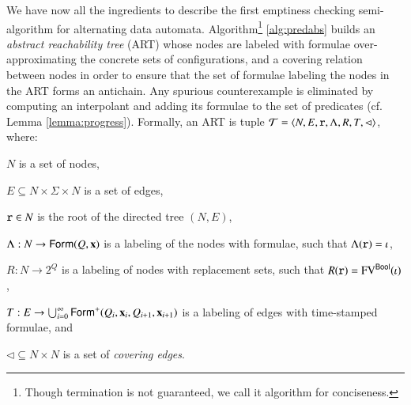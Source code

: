 \documentclass[10pt]{llncs}
\begin{document}
We have now all the ingredients to describe the first emptiness
checking semi-algorithm for alternating data
automata. Algorithm\footnote{Though termination is not guaranteed, we
  call it algorithm for conciseness.} \ref{alg:predabs} builds an
\emph{abstract reachability tree} (ART) whose nodes are labeled with
formulae over-approximating the concrete sets of configurations, and a
covering relation between nodes in order to ensure that the set of
formulae labeling the nodes in the ART forms an antichain. Any
spurious counterexample is eliminated by computing an interpolant and
adding its formulae to the set of predicates (cf. Lemma
\ref{lemma:progress}). Formally, an ART is tuple $\mathcal{T} =
\left\langle N,E,\mathtt{r},\Lambda,R,T,\lhd \right\rangle$, where: \begin{compactitem}
\item $N$ is a set of nodes, 
%
\item $E \subseteq N \times \Sigma \times
N$ is a set of edges, 
%
\item $\mathtt{r} \in N$ is the root of the directed
tree $(N,E)$, 
%
\item $\Lambda : N \rightarrow \mathsf{Form}(Q,\mathbf x)$ is a labeling of the
  nodes with formulae, such that $\Lambda(\mathtt{r}) = \iota$,
%
\item $R : N \rightarrow 2^Q$ is a labeling of nodes with replacement
  sets, such that $R(\mathtt{r}) = \mathrm{FV}^{\mathsf{Bool}}(\iota)$,
%
\item $T : E \rightarrow \bigcup_{i=0}^\infty
  \mathsf{Form}^+(Q_i,\mathbf x_i,Q_{i+1},\mathbf x_{i+1})$ is a labeling of edges
  with time-stamped formulae, and
%
\item $\lhd \subseteq N \times N$ is a set of
\emph{covering edges}. 
\end{compactitem}
\end{document}
